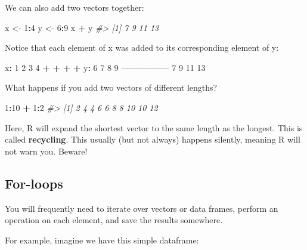 \documentclass[]{book}
\newenvironment{Shaded}{\begin{snugshade}}{\end{snugshade}}
\newcommand{\CommentTok}[1]{\textcolor[rgb]{0.56,0.35,0.01}{\textit{#1}}}
\newcommand{\DecValTok}[1]{\textcolor[rgb]{0.00,0.00,0.81}{#1}}
\newcommand{\NormalTok}[1]{#1}
\newcommand{\OperatorTok}[1]{\textcolor[rgb]{0.81,0.36,0.00}{\textbf{#1}}}
\newcommand{\StringTok}[1]{\textcolor[rgb]{0.31,0.60,0.02}{#1}}
\begin{document}
We can also add two vectors together:

\begin{Shaded}
\begin{Highlighting}[]
\NormalTok{x <-}\StringTok{ }\DecValTok{1}\OperatorTok{:}\DecValTok{4}
\NormalTok{y <-}\StringTok{ }\DecValTok{6}\OperatorTok{:}\DecValTok{9}
\NormalTok{x }\OperatorTok{+}\StringTok{ }\NormalTok{y}
\CommentTok{#> [1]  7  9 11 13}
\end{Highlighting}
\end{Shaded}

Notice that each element of x was added to its corresponding element of y:

\begin{Shaded}
\begin{Highlighting}[]
\NormalTok{x}\OperatorTok{:}\StringTok{  }\DecValTok{1}  \DecValTok{2}  \DecValTok{3}  \DecValTok{4}
    \OperatorTok{+}\StringTok{  }\OperatorTok{+}\StringTok{  }\OperatorTok{+}\StringTok{  }\OperatorTok{+}
\NormalTok{y}\OperatorTok{:}\StringTok{  }\DecValTok{6}  \DecValTok{7}  \DecValTok{8}  \DecValTok{9}
\OperatorTok{---------------}
\StringTok{    }\DecValTok{7}  \DecValTok{9} \DecValTok{11} \DecValTok{13}
\end{Highlighting}
\end{Shaded}

What happens if you add two vectors of different lengths?

\begin{Shaded}
\begin{Highlighting}[]
\DecValTok{1}\OperatorTok{:}\DecValTok{10} \OperatorTok{+}\StringTok{ }\DecValTok{1}\OperatorTok{:}\DecValTok{2}
\CommentTok{#>  [1]  2  4  4  6  6  8  8 10 10 12}
\end{Highlighting}
\end{Shaded}

Here, R will expand the shortest vector to the same length as the longest. This is called \textbf{recycling}. This usually (but not always) happens silently, meaning R will not warn you. Beware!

\hypertarget{for-loops}{%
\subsection{For-loops}\label{for-loops}}

You will frequently need to iterate over vectors or data frames, perform an operation on each element, and save the results somewhere.

For example, imagine we have this simple dataframe:
\end{document}
